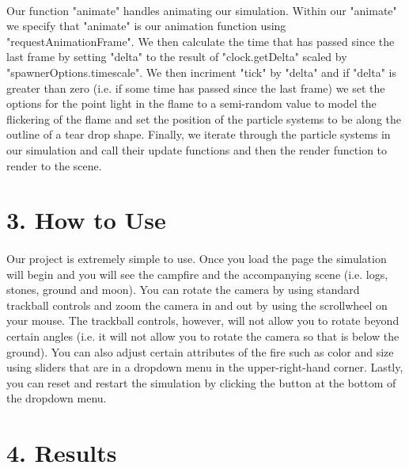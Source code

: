 \documentclass[letterpaper]{article}
\begin{document}
\paragraph{}
    Our function "animate" handles animating our simulation. Within our "animate" we specify that "animate" is our animation function using "requestAnimationFrame". We then calculate the time that has passed since the last frame by setting "delta" to the result of "clock.getDelta" scaled by "spawnerOptions.timescale". We then incriment "tick" by "delta" and if "delta" is greater than zero (i.e. if some time has passed since the last frame) we set the options for the point light in the flame to a semi-random value to model the flickering of the flame and set the position of the particle systems to be along the outline of a tear drop shape. Finally, we iterate through the particle systems in our simulation and call their update functions and then the render function to render to the scene. 

\section*{3. How to Use}

\paragraph{}
    Our project is extremely simple to use. Once you load the page the simulation will begin and you will see the campfire and the accompanying scene (i.e. logs, stones, ground and moon). You can rotate the camera by using standard trackball controls and zoom the camera in and out by using the scrollwheel on your mouse. The trackball controls, however, will not allow you to rotate beyond certain angles (i.e. it will not allow you to rotate the camera so that is below the ground). You can also adjust certain attributes of the fire such as color and size using sliders that are in a dropdown menu in the upper-right-hand corner. Lastly, you can reset and restart the simulation by clicking the button at the bottom of the dropdown menu.

\section*{4. Results}
\end{document}

